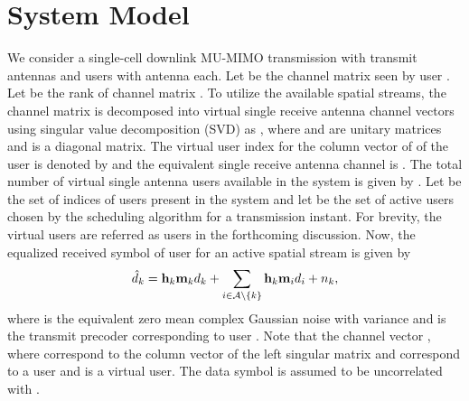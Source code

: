 \documentclass[conference,letterpaper]{./../../IEEE/IEEEtran}
\begin{document}
\section{System Model}
\label{sec:system_model}
We consider a single-cell downlink MU-MIMO transmission with  transmit antennas and  users with  antenna each. Let  be the channel matrix seen by user . Let  be the rank of channel matrix . To utilize the available spatial streams, the channel matrix  is decomposed into  virtual single receive antenna channel vectors using singular value decomposition (SVD) as , where  and  are unitary matrices and  is a diagonal matrix. The virtual user index for the  column vector of  of the  user is denoted by  and the equivalent single receive antenna channel is . The total number of virtual single antenna users available in the system is given by . Let  be the set of indices of users present in the system and let  be the set of active users chosen by the scheduling algorithm for a transmission instant. For brevity, the virtual users are referred as users in the forthcoming discussion. Now, the equalized received symbol  of user  for an active spatial stream is given by
\begin{equation}
	\hat{d}_k = \mathbf{h}_{k} \mathbf{m}_{k} d_k + \sum_{i \in \mathcal{A} \backslash \{k\}} \mathbf{h}_{k} \mathbf{m}_{i} d_i + {n}_{k},
\end{equation}
where  is the equivalent zero mean complex Gaussian noise with variance  and  is the transmit precoder corresponding to user . Note that the channel vector , where  correspond to the  column vector of the left singular matrix  and  correspond to a user and  is a virtual user. The data symbol  is assumed to be uncorrelated with .
\end{document}
